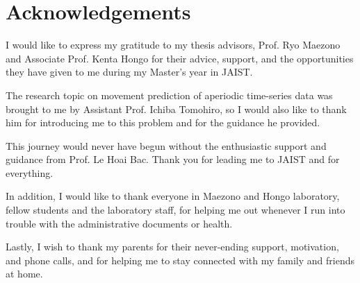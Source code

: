 \chapter*{Acknowledgements}

I would like to express my gratitude to my thesis advisors, Prof. Ryo Maezono and Associate Prof. Kenta Hongo for their advice, support, and the opportunities they have given to me during my Master's year in JAIST.

The research topic on movement prediction of aperiodic time-series data was brought to me by Assistant Prof. Ichiba Tomohiro, so I would also like to thank him for introducing me to this problem and for the guidance he provided.

This journey would never have begun without the enthusiastic support and guidance from Prof. Le Hoai Bac. Thank you for leading me to JAIST and for everything.

In addition, I would like to thank everyone in Maezono and Hongo laboratory, fellow students and the laboratory staff, for helping me out whenever I run into trouble with the administrative documents or health.

Lastly, I wish to thank my parents for their never-ending support, motivation, and phone calls, and for helping me to stay connected with my family and friends at home.

